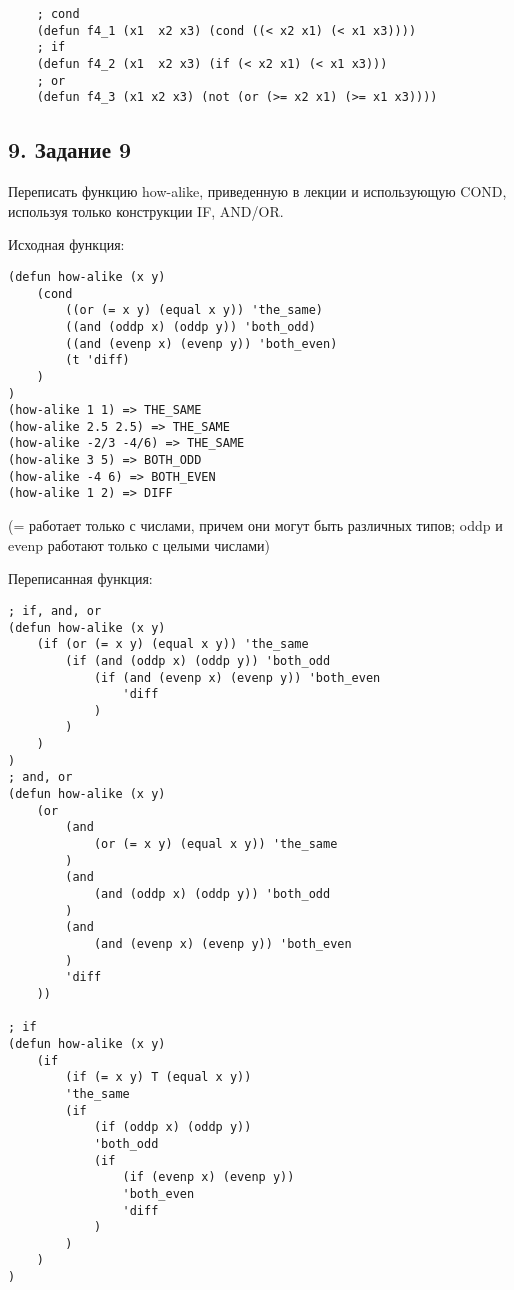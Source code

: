 \begin{lstlisting}
	; cond
	(defun f4_1 (x1  x2 x3) (cond ((< x2 x1) (< x1 x3))))
	; if
	(defun f4_2 (x1  x2 x3) (if (< x2 x1) (< x1 x3)))
	; or 
	(defun f4_3 (x1 x2 x3) (not (or (>= x2 x1) (>= x1 x3))))
\end{lstlisting}

\subsection*{9. Задание 9}

Переписать функцию how-alike, приведенную в лекции и использующую COND, используя только конструкции IF, AND/OR.

Исходная функция:
\begin{lstlisting}
(defun how-alike (x y) 
	(cond 
		((or (= x y) (equal x y)) 'the_same) 
		((and (oddp x) (oddp y)) 'both_odd) 
		((and (evenp x) (evenp y)) 'both_even) 
		(t 'diff)
	)
)
(how-alike 1 1) => THE_SAME
(how-alike 2.5 2.5) => THE_SAME
(how-alike -2/3 -4/6) => THE_SAME
(how-alike 3 5) => BOTH_ODD
(how-alike -4 6) => BOTH_EVEN
(how-alike 1 2) => DIFF
\end{lstlisting}

(= работает только с числами, причем они могут быть различных типов; oddp и evenp работают только с целыми числами)

Переписанная функция:
\begin{lstlisting}
; if, and, or
(defun how-alike (x y) 
	(if (or (= x y) (equal x y)) 'the_same 
		(if (and (oddp x) (oddp y)) 'both_odd 
			(if (and (evenp x) (evenp y)) 'both_even 
				'diff
			)
		)
	)
)
; and, or
(defun how-alike (x y) 
	(or 
		(and 
			(or (= x y) (equal x y)) 'the_same
		) 
		(and 
			(and (oddp x) (oddp y)) 'both_odd
		) 
		(and 
			(and (evenp x) (evenp y)) 'both_even
		) 
		'diff
	))
	
; if		
(defun how-alike (x y) 
	(if 
		(if (= x y) T (equal x y))
		'the_same
		(if 
			(if (oddp x) (oddp y))
			'both_odd 
			(if 
				(if (evenp x) (evenp y))
				'both_even
				'diff
			)
		)
	)
)
\end{lstlisting}
